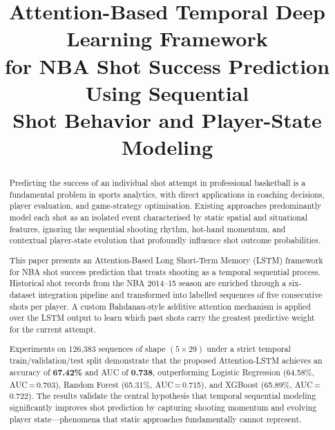 \documentclass[conference]{IEEEtran}
\begin{document}
\title{Attention-Based Temporal Deep Learning Framework\\
for NBA Shot Success Prediction Using Sequential\\
Shot Behavior and Player-State Modeling}

\author{
}

\maketitle

\begin{abstract}
Predicting the success of an individual shot attempt in professional
basketball is a fundamental problem in sports analytics, with direct
applications in coaching decisions, player evaluation, and game-strategy
optimisation.  Existing approaches predominantly model each shot as an
isolated event characterised by static spatial and situational features,
ignoring the sequential shooting rhythm, hot-hand momentum, and
contextual player-state evolution that profoundly influence shot outcome
probabilities.

This paper presents an Attention-Based Long Short-Term Memory (LSTM)
framework for NBA shot success prediction that treats shooting as a
temporal sequential process.  Historical shot records from the NBA
2014--15 season are enriched through a six-dataset integration pipeline
and transformed into labelled sequences of five consecutive shots per
player.  A custom Bahdanau-style additive attention mechanism is applied
over the LSTM output to learn which past shots carry the greatest
predictive weight for the current attempt.

Experiments on 126{,}383 sequences of shape $(5 \times 29)$ under a
strict temporal train/validation/test split demonstrate that the proposed
Attention-LSTM achieves an accuracy of \textbf{67.42\%} and AUC of
\textbf{0.738}, outperforming Logistic Regression (64.58\%,
AUC\,=\,0.703), Random Forest (65.31\%, AUC\,=\,0.715), and XGBoost
(65.89\%, AUC\,=\,0.722).  The results validate the central hypothesis
that temporal sequential modeling significantly improves shot prediction
by capturing shooting momentum and evolving player state—phenomena that
static approaches fundamentally cannot represent.
\end{abstract}
\end{document}
